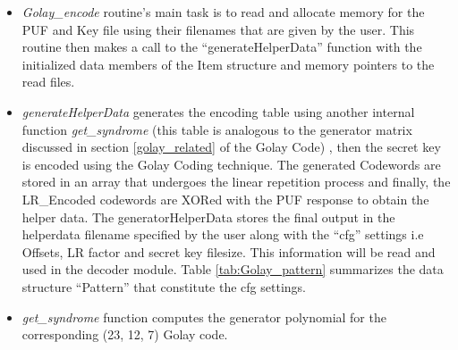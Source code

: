 	\begin{itemize}
		\item \emph{Golay\_encode} routine's main task is to read and allocate memory for the PUF and Key file using their filenames that are given by the user. This routine then makes a call to the ``generateHelperData'' function with the initialized data members of the Item structure and memory pointers to the read files.
		\item \emph{generateHelperData} generates the encoding table using another internal function \emph{get\_syndrome} (this table is analogous to the generator matrix discussed in section \ref{golay_related} of the Golay Code) , then the secret key is encoded using the Golay Coding technique. The generated Codewords are stored in an array that undergoes the linear repetition process and finally, the LR\_Encoded codewords are XORed with the PUF response to obtain the
			helper data. The generatorHelperData stores the final output in the helperdata filename specified by the user along with the ``cfg'' settings i.e Offsets, LR factor and secret key filesize. This information will be read and used in the decoder module. Table \ref{tab:Golay_pattern} summarizes the data structure ``Pattern'' that constitute the cfg settings.

		\item \emph{get\_syndrome} function computes the generator polynomial for the corresponding (23, 12, 7) Golay code. \end{itemize}

